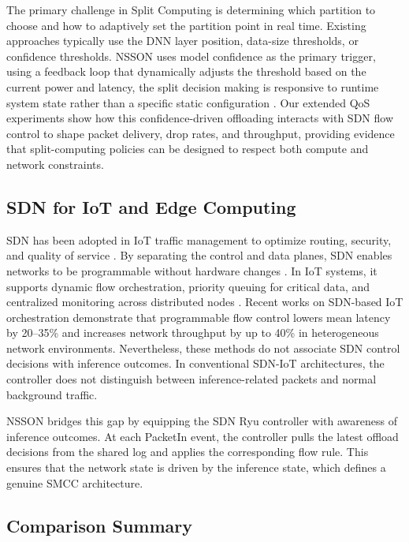\documentclass[journal]{IEEEtran}
\begin{document}
The primary challenge in Split Computing is determining which partition to choose and how to adaptively set the partition point in real time. Existing approaches typically use the DNN layer position, data-size thresholds, or confidence thresholds. NSSON uses model confidence as the primary trigger, using a feedback loop that dynamically adjusts the threshold based on the current power and latency, the split decision making is responsive to runtime system state rather than a specific static configuration \cite{tian2026survey,zhu2023pushing,fan2025latency}.
Our extended QoS experiments show how this confidence-driven offloading interacts with SDN flow control to shape packet delivery, drop rates, and throughput, providing evidence that split-computing policies can be designed to respect both compute and network constraints.

\subsection{SDN for IoT and Edge Computing}

SDN has been adopted in IoT traffic management to optimize routing, security, and quality of service \cite{kreutz2014software}. By separating the control and data planes, SDN enables networks to be programmable without hardware changes \cite{mckeown2008openflow}. In IoT systems, it supports dynamic flow orchestration, priority queuing for critical data, and centralized monitoring across distributed nodes \cite{siddiqui2022toward,jazaeri2021edge,lo2023sdn,ray2025internet}.
Recent works on SDN-based IoT orchestration demonstrate that programmable flow control lowers mean latency by 20--35\% and increases network throughput by up to 40\% in heterogeneous network environments. Nevertheless, these methods do not associate SDN control decisions with inference outcomes. In conventional SDN-IoT architectures, the controller does not distinguish between inference-related packets and normal background traffic.

NSSON bridges this gap by equipping the SDN Ryu controller with awareness of inference outcomes. At each PacketIn event, the controller pulls the latest offload decisions from the shared log and applies the corresponding flow rule. This ensures that the network state is driven by the inference state, which defines a genuine SMCC architecture.

\subsection{Comparison Summary}
\end{document}
